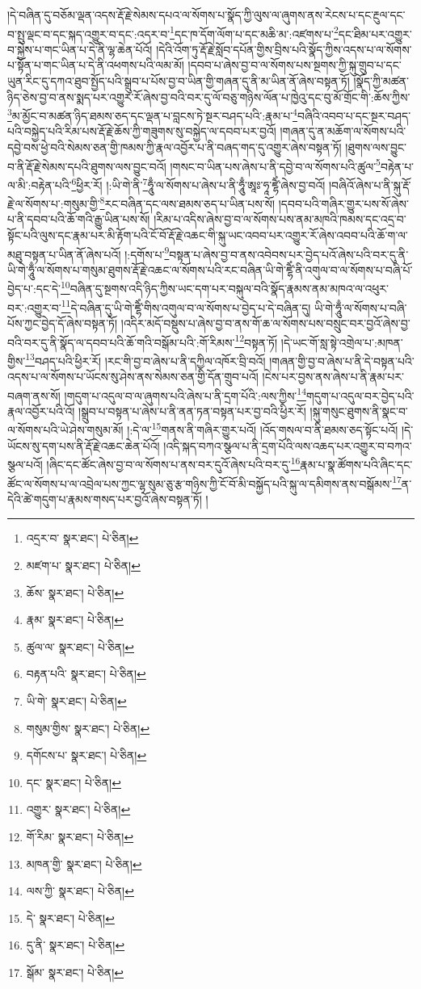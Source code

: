 །དེ་བཞིན་དུ་བཅོམ་ལྡན་འདས་རྡོ་རྗེ་སེམས་དཔའ་ལ་སོགས་པ་སྣོད་ཀྱི་ལུས་ལ་ཞུགས་ནས་རེངས་པ་དང་རྔུལ་དང་བ་སྤུ་ལྡང་བ་དང་སྐད་འགྱུར་བ་དང་:འདར་བ་\footnote{འདྲར་བ་  སྣར་ཐང་།  པེ་ཅིན། }དང་ཁ་དོག་ལོག་པ་དང་མཆི་མ་:འཛགས་པ་\footnote{མཛག་པ་  སྣར་ཐང་།  པེ་ཅིན། }དང་ཐིམ་པར་འགྱུར་བ་སྐྱེས་པ་གང་ཡིན་པ་དེ་ནི་ལྷ་ཆེན་པོའོ། །དེའི་འོག་ཏུ་རྡོ་རྗེ་སློབ་དཔོན་གྱིས་བྲིས་པའི་སྣོད་ཀྱིས་འདས་པ་ལ་སོགས་པ་སྟོན་པ་གང་ཡིན་པ་དེ་ནི་འཕགས་པའི་ལམ་མོ། །དབབ་པ་ཞེས་བྱ་བ་ལ་སོགས་པས་སྔགས་ཀྱི་སྐུ་གྲུབ་པ་དང་ཡུན་རིང་དུ་དཀའ་ཐུབ་སྤྱོད་པའི་སྒྲུབ་པ་པོས་བྱ་བ་ཡིན་གྱི་གཞན་དུ་ནི་མ་ཡིན་ནོ་ཞེས་བསྟན་ཏོ། །སྣོད་ཀྱི་མཚན་ཉིད་ཅེས་བྱ་བ་ནས་སྨད་པར་འགྱུར་རོ་ཞེས་བྱ་བའི་བར་དུ་ལོ་བཅུ་གཉིས་ལོན་པ་ཁྱེའུ་དང་བུ་མོ་གྲོང་གི་:ཆོས་ཀྱིས་\footnote{ཆོས་  སྣར་ཐང་།  པེ་ཅིན། }མ་མྱོང་བ་མཚན་ཉིད་ཐམས་ཅད་དང་ལྡན་པ་བླངས་ཏེ་སྔར་བཤད་པའི་:རྣམ་པ་\footnote{རྣམ་  སྣར་ཐང་།  པེ་ཅིན། }བཞིའི་འབབ་པ་དང་སྔར་བཤད་པའི་བསྐྱེད་པའི་རིམ་པས་རྡོ་རྗེ་ཆོས་ཀྱི་གཟུགས་སུ་བསྐྱེད་ལ་དབབ་པར་བྱའོ། །གཞན་དུ་ན་མཆོག་ལ་སོགས་པའི་དབྱེ་བས་ཕྱེ་བའི་སེམས་ཅན་གྱི་ཁམས་ཀྱི་རྣལ་འབྱོར་པ་ནི་བཞད་གད་དུ་འགྱུར་ཞེས་བསྟན་ཏོ། །ཐུགས་ལས་བྱུང་བ་ནི་རྡོ་རྗེ་སེམས་དཔའི་ཐུགས་ལས་བྱུང་བའོ། །གསང་བ་ཡིན་པས་ཞེས་པ་ནི་དབྱེ་བ་ལ་སོགས་པའི་ཚུལ་\footnote{ཚུལ་ལ་  སྣར་ཐང་།  པེ་ཅིན། }བརྟེན་པ་ལ་མི་:བརྟེན་པའི་\footnote{བརྟན་པའི་  སྣར་ཐང་།  པེ་ཅིན། }ཕྱིར་རོ། །:ཡི་གེ་ནི་\footnote{ཡི་གེ་  སྣར་ཐང་།  པེ་ཅིན། }ཧཱུྃ་ལ་སོགས་པ་ཞེས་པ་ནི་ཧཱུྃ་ཨཱཿ་ཧཱ་ཛྷཻཾ་ཞེས་བྱ་བའོ། །བཞིའོ་ཞེས་པ་ནི་སྐུ་རྡོ་རྗེ་ལ་སོགས་པ་:གསུམ་གྱི་\footnote{གསུམ་གྱིས་  སྣར་ཐང་།  པེ་ཅིན། }རང་བཞིན་དང་ལས་ཐམས་ཅད་པ་ཡིན་པས་སོ། །དབབ་པའི་གཞིར་གྱུར་པས་སོ་ཞེས་པ་ནི་དབབ་པའི་ཆོ་གའི་རྒྱུ་ཡིན་པས་སོ། །རིམ་པ་འདིས་ཞེས་བྱ་བ་ལ་སོགས་པས་ནམ་མཁའི་ཁམས་དང་འདྲ་བ་སྟོང་པའི་ལུས་དང་རྣམ་པར་མི་རྟོག་པའི་ངོ་བོ་རྡོ་རྗེ་འཆང་གི་སྐུ་ཡང་འབབ་པར་འགྱུར་རོ་ཞེས་འབབ་པའི་ཆོ་ག་ལ་མཐུ་བསྟན་པ་ཡིན་ནོ་ཞེས་པའོ། །:དགོས་པ་\footnote{དགོངས་པ་  སྣར་ཐང་།  པེ་ཅིན། }བསྟན་པ་ཞེས་བྱ་བ་ནས་འབེབས་པར་བྱེད་པའོ་ཞེས་པའི་བར་དུ་ནི་ཡི་གེ་ཧཱུྃ་ལ་སོགས་པ་གསུམ་ཐུགས་རྡོ་རྗེ་འཆང་ལ་སོགས་པའི་རང་བཞིན་ཡི་གེ་ཛྷཻཾ་ནི་འགུལ་བ་ལ་སོགས་པ་བཞི་པོ་བྱེད་པ་:དང་དེ་\footnote{དང་  སྣར་ཐང་།  པེ་ཅིན། }བཞིན་དུ་སྔགས་འདི་ཉིད་ཀྱིས་ཡང་དག་པར་བསྐུལ་བའི་སྣོད་རྣམས་ནམ་མཁའ་ལ་འཕུར་བར་:འགྱུར་བ་\footnote{འགྱུར་  སྣར་ཐང་།  པེ་ཅིན། }དེ་བཞིན་དུ་ཡི་གེ་ཛྷཻཾ་གིས་འགུལ་བ་ལ་སོགས་པ་བྱེད་པ་དེ་བཞིན་དུ། ཡི་གེ་ཧཱུྃ་ལ་སོགས་པ་བཞི་པོས་ཀྱང་བྱེད་དོ་ཞེས་བསྟན་ཏོ། །འདིར་མདོ་བསྡུས་པ་ཞེས་བྱ་བ་ནས་གོ་ཆ་ལ་སོགས་པས་བསྲུང་བར་བྱའོ་ཞེས་བྱ་བའི་བར་དུ་ནི་སྣོད་ལ་དབབ་པའི་ཆོ་གའི་བསྒོམ་པའི་:གོ་རིམས་\footnote{གོ་རིམ་  སྣར་ཐང་།  པེ་ཅིན། }བསྟན་ཏོ། །དེ་ཡང་གོ་སླ་སྟེ་འགྲེལ་པ་:མཁན་གྱིས་\footnote{མཁན་གྱི་  སྣར་ཐང་།  པེ་ཅིན། }བཤད་པའི་ཕྱིར་རོ། །རང་གི་བྱ་བ་ཞེས་པ་ནི་དཀྱིལ་འཁོར་བྲི་བའོ། །གཞན་གྱི་བྱ་བ་ཞེས་པ་ནི་དེ་བསྟན་པའི་འདས་པ་ལ་སོགས་པ་ཡོངས་སུ་ཤེས་ནས་སེམས་ཅན་གྱི་དོན་གྲུབ་པའོ། །ངེས་པར་བྱས་ནས་ཞེས་པ་ནི་རྣམ་པར་བཞག་ནས་སོ། །གདུག་པ་འདུལ་བ་ལ་ཞུགས་པའི་ཞེས་པ་ནི་དྲག་པོའི་:ལས་ཀྱིས་\footnote{ལས་ཀྱི་  སྣར་ཐང་།  པེ་ཅིན། }གདུག་པ་འདུལ་བར་བྱེད་པའི་རྣལ་འབྱོར་པའི་འོ། །སྒྲུབ་པ་བསྟན་པ་ཞེས་པ་ནི་ནན་ཏན་བསྟན་པར་བྱ་བའི་ཕྱིར་རོ། །སྐུ་གསུང་ཐུགས་ནི་སྣང་བ་ལ་སོགས་པའི་ཡེ་ཤེས་གསུམ་མོ། །:དེ་ལ་\footnote{དེ་  སྣར་ཐང་།  པེ་ཅིན། }གནས་ནི་གཞིར་གྱུར་པའོ། །འོད་གསལ་བ་ནི་ཐམས་ཅད་སྟོང་པའོ། །དེ་ཡོངས་སུ་དག་པས་ནི་རྡོ་རྗེ་འཆང་ཆེན་པོའོ། །འདི་སྐད་བཀའ་སྩལ་པ་ནི་དྲག་པོའི་ལས་འཆད་པར་འགྱུར་བ་བཀའ་སྩལ་པའོ། །ཞིང་དང་ཚོང་ཞེས་བྱ་བ་ལ་སོགས་པ་ནས་བར་དུའོ་ཞེས་པའི་བར་དུ་\footnote{དུ་ནི་  སྣར་ཐང་།  པེ་ཅིན། }རྣམ་པ་སྣ་ཚོགས་པའི་ཞིང་དང་ཚོང་ལ་སོགས་པ་ལ་འབྲེལ་པས་ཀྱང་ལྷ་སུམ་ཅུ་རྩ་གཉིས་ཀྱི་ངོ་བོ་མི་བསྐྱོད་པའི་སྐུ་ལ་དམིགས་ནས་བསྒོམས་\footnote{སྒོམ་  སྣར་ཐང་།  པེ་ཅིན། }ན་དེའི་ཚེ་གདུག་པ་རྣམས་གསད་པར་བྱའོ་ཞེས་བསྟན་ཏོ། །
